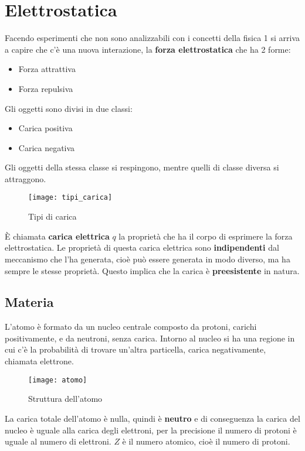 \documentclass[a4paper]{article}
\begin{document}
\section{Elettrostatica}
Facendo esperimenti che non sono analizzabili con i concetti della fisica 1 si arriva
a capire che c'è una nuova interazione, la \textbf{forza elettrostatica} che ha 2 forme:
\begin{itemize}
  \item Forza attrattiva
  \item Forza repulsiva
\end{itemize}
Gli oggetti sono divisi in due classi:
\begin{itemize}
  \item Carica positiva
  \item Carica negativa
\end{itemize}
Gli oggetti della stessa classe si respingono, mentre quelli di classe diversa si attraggono.
\begin{figure}[H]
  \centering
  \texttt{[image: tipi\_carica]}
  \caption{Tipi di carica}
\end{figure}
\begin{definition}
  È chiamata \textbf{carica elettrica} \( q \) la proprietà che ha il corpo di esprimere
  la forza elettrostatica. Le proprietà di questa carica elettrica sono \textbf{indipendenti} dal
  meccanismo che l'ha generata, cioè può essere generata in modo diverso, ma ha sempre le
  stesse proprietà. Questo implica che la carica è \textbf{preesistente} in natura.
\end{definition}

\subsection{Materia}
L'atomo è formato da un nucleo centrale composto da protoni, carichi positivamente, e da
neutroni, senza carica. Intorno al nucleo si ha una regione in cui c'è la probabilità
di trovare un'altra particella, carica negativamente, chiamata elettrone.
\begin{figure}[H]
  \centering
  \texttt{[image: atomo]}
  \caption{Struttura dell'atomo}
\end{figure}
\noindent
La carica totale dell'atomo è nulla, quindi è \textbf{neutro} e
di conseguenza la carica del nucleo è uguale alla carica degli elettroni, per la precisione
il numero di protoni è uguale al numero di elettroni. \( Z \) è il numero atomico, cioè
il numero di protoni.
\end{document}
